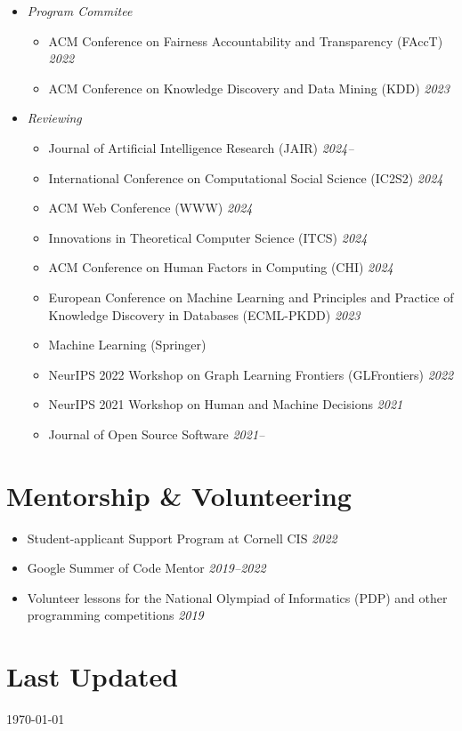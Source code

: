 \documentclass[margin]{res}
\begin{document}
\begin{resume}
\begin{itemize}[nosep]
	\item \emph{Program Commitee}
	\begin{itemize}[nosep]
		\item ACM Conference on Fairness Accountability and Transparency (FAccT) \hfill \emph{2022}
		\item ACM Conference on Knowledge Discovery and Data Mining (KDD) \hfill \emph{2023}
	\end{itemize}
	\item \emph{Reviewing}
	\begin{itemize}[nosep]
		\item Journal of Artificial Intelligence Research (JAIR) \hfill \emph{2024--}
		\item International Conference on Computational Social Science (IC2S2) \hfill \emph{2024}
		\item ACM Web Conference (WWW) \hfill \emph{2024}
		\item Innovations in Theoretical Computer Science (ITCS) \hfill \emph{2024}
		\item ACM Conference on Human Factors in Computing (CHI) \hfill \emph{2024}
		\item European Conference on Machine Learning and Principles and Practice of Knowledge Discovery in Databases (ECML-PKDD) \hfill \emph{2023}
		\item Machine Learning (Springer)
		\item NeurIPS 2022 Workshop on Graph Learning Frontiers (GLFrontiers) \hfill \emph{2022}
		\item NeurIPS 2021 Workshop on Human and Machine Decisions \hfill \emph{2021} 
		\item Journal of Open Source Software \hfill \emph{2021--}
	\end{itemize}

\end{itemize}

	
\section{Mentorship \& Volunteering}
	
	
	\begin{itemize}[nosep]
		\item Student-applicant Support Program at Cornell CIS \hfill \emph{2022}
		\item Google Summer of Code Mentor \hfill \emph{2019--2022}
		\item Volunteer lessons for the National Olympiad of Informatics (PDP) and other programming competitions  \hfill \emph{2019}
	\end{itemize}
	

\section{Last Updated} \today


\end{resume}
\end{document}
